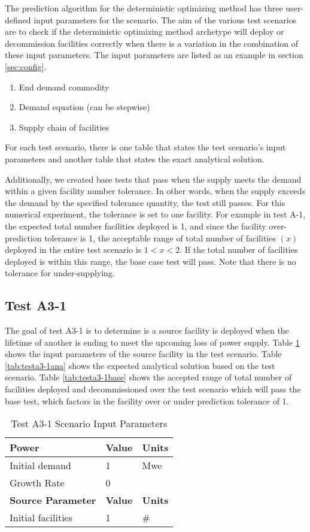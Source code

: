 \documentclass[11pt,letterpaper]{article}
\begin{document}
The prediction algorithm for the deterministic optimizing method has three user-defined input parameters for the scenario.
The aim of the various test scenarios are to check if the
deterministic optimizing method archetype will deploy or decommission facilities correctly when there is a variation
in the combination of these input parameters. The input parameters are listed as an example in section \ref{sec:config}.

\begin{enumerate}
	\item End demand commodity
	\item Demand equation (can be stepwise)
	\item Supply chain of facilities
\end{enumerate}

For each test scenario, there is one table that states the test scenario's input parameters and another table that states the exact analytical solution. 

Additionally, we created base tests that pass when the supply meets the demand within a given facility number tolerance.
In other words, when the supply exceeds the demand by the specified tolerance quantity, the test still passes.
For this numerical experiment, the tolerance is set to one facility. For example in test A-1, the expected
total number facilities deployed is 1, and since the facility over-prediction tolerance is 1, the acceptable
range of total number of facilities $(x)$ deployed in the entire test scenario is $1<x<2$. If the total
number of facilities deployed is within this range, the base case test will pass. Note that there is no tolerance for under-supplying.   

\subsection{Test A3-1}
The goal of test A3-1 is to determine is a source facility is deployed when the lifetime of another is ending to meet the upcoming loss of power supply. 
Table \ref{tab:testa3-1} shows the input parameters of the source facility in the test scenario. Table \ref{tab:testa3-1ana} shows the expected analytical solution based on the test scenario. Table \ref{tab:testa3-1base} shows the accepted range of total number of facilities deployed and decommissioned over the test scenario which will pass the base test, which factors in the facility over or under prediction tolerance of 1. 
\begin{table}[H]
	\centering
	\caption{Test A3-1 Scenario Input Parameters }
	\label{tab:testa3-1}
	\begin{tabular}{|l|l|l|}
		\hline
		\textbf{Power} & \textbf{Value} & \textbf{Units} \\
		\hline 
		Initial demand & 1 & Mwe \\
		Growth Rate & 0 & \\
		\hline
		\textbf{Source Parameter} & \textbf{Value} & \textbf{Units} \\
		\hline
		Initial facilities & 1 & \#\\
		\hline
	\end{tabular}
\end{table}
\end{document}
